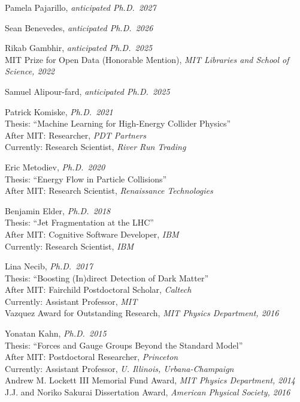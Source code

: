 \bbl

\item Pamela Pajarillo, \emph{anticipated Ph.D.~2027}

\item Sean Benevedes, \emph{anticipated Ph.D.~2026}

\item Rikab Gambhir, \emph{anticipated Ph.D.~2025}
\\ MIT Prize for Open Data (Honorable Mention), \emph{MIT Libraries and School of Science, 2022}

\item Samuel Alipour-fard, \emph{anticipated Ph.D.~2025}

\item Patrick Komiske, \emph{Ph.D.~2021}
\\ Thesis: ``Machine Learning for High-Energy Collider Physics''
\\ After MIT: Researcher, \emph{PDT Partners}
\\ Currently: Research Scientist, \emph{River Run Trading}

\item Eric Metodiev, \emph{Ph.D.~2020}
\\ Thesis: ``Energy Flow in Particle Collisions''
\\ After MIT: Research Scientist, \emph{Renaissance Technologies}

\item Benjamin Elder, \emph{Ph.D.~2018}
\\ Thesis: ``Jet Fragmentation at the LHC''
\\ After MIT: Cognitive Software Developer, \emph{IBM}
\\ Currently: Research Scientist, \emph{IBM}

\item Lina Necib, \emph{Ph.D.~2017}
\\ Thesis: ``Boosting (In)direct Detection of Dark Matter''
\\ After MIT: Fairchild Postdoctoral Scholar, \emph{Caltech}
\\ Currently: Assistant Professor, \emph{MIT}
\\ Vazquez Award for Outstanding Research, \emph{MIT Physics Department, 2016}

\item Yonatan Kahn, \emph{Ph.D.~2015}
\\ Thesis: ``Forces and Gauge Groups Beyond the Standard Model''
\\ After MIT: Postdoctoral Researcher, \emph{Princeton}
\\ Currently: Assistant Professor, \emph{U. Illinois, Urbana-Champaign}
\\ Andrew M. Lockett III Memorial Fund Award, \emph{MIT Physics Department, 2014}
\\ J.J. and Noriko Sakurai Dissertation Award, \emph{American Physical Society, 2016}

